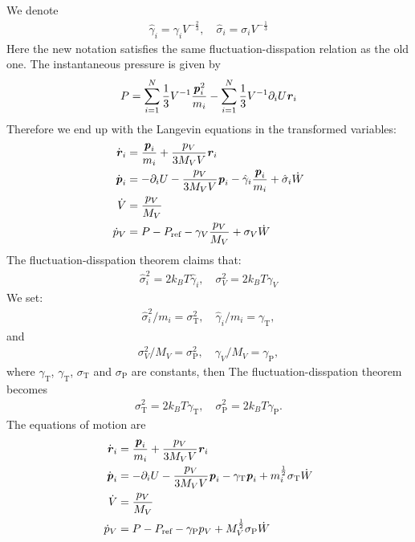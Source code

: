 \documentclass[aps, pre, preprint,unsortedaddress,a4paper,onecolumn]{revtex4}
\newcommand{\vect}[1]{\textbf{\textit{#1}}}
\newcommand{\target}{\textrm{ref}}
\newcommand{\temp}[0]{{\textrm{T}}}
\newcommand{\pres}[0]{{\textrm{P}}}
\begin{document}
We denote
\begin{align}
  \hat \gamma_i = \gamma_i V^{-\frac23}, \quad \hat \sigma_i = \sigma_i V^{-\frac13}
\end{align}
Here the new notation satisfies the same fluctuation-disspation relation as the old one.
The instantaneous pressure is given by
\begin{align}
  P =
  \sum_{i=1}^N \frac13 V^{-1} \frac{\vect p_i^2}{m_i}
  -
  \sum_{i=1}^N \frac13 V^{-1} \partial_i U  \vect r_i
\end{align}
Therefore we end up with the Langevin equations in the transformed variables:
\begin{align}
  \dot{\vect r}_i
  &= \frac{\vect p_i}{m_i} + \frac{p_V}{3M_VV} \vect r_i\\
  \dot{\vect p}_i
  & =
  -\partial_i U - \frac{p_V}{3M_VV}\vect p_i - \hat\gamma_i\frac{\vect p_i}{m_i}
  + \hat\sigma_i\dot W\\
  \dot{V} 
  &=
  \frac{p_V}{M_V} \\
  \dot{p}_V
  &=
  P - P_\target - \gamma_V  \frac{p_V}{M_V} + \sigma_V\dot W   
\end{align}
The fluctuation-disspation theorem claims that:
\begin{align}
  \hat \sigma_i^2 = 2k_BT \hat\gamma_i ,\quad
  \sigma_V^2 = 2k_BT \gamma_V 
\end{align}
We set:
\begin{align}
  \hat\sigma_i^2 / m_i = \sigma_\temp^2, \quad \hat\gamma_i / m_i = \gamma_\temp,
\end{align}
and
\begin{align}
  \sigma_V^2 / M_V = \sigma_\pres^2, \quad \gamma_V / M_V = \gamma_\pres,
\end{align}
where $\gamma_\temp$, $\gamma_\temp$, $\sigma_\temp$ and $\sigma_\pres$ are constants, then
The fluctuation-disspation theorem becomes
\begin{align}
  \sigma_\temp^2 = 2k_BT \gamma_\temp ,\quad
  \sigma_\pres^2 = 2k_BT \gamma_\pres.
\end{align}
The equations of motion are
\begin{align}\label{eq:eom-1}
  \dot{\vect r}_i
  &= \frac{\vect p_i}{m_i} + \frac{p_V}{3M_VV} \vect r_i\\\label{eq:eom-2}
  \dot{\vect p}_i
  & =
  -\partial_i U - \frac{p_V}{3M_VV}\vect p_i - \gamma_\temp{\vect p_i}
  + m_i^{\frac12}\sigma_\temp\dot W\\ \label{eq:eom-3}
  \dot{V} 
  &=
  \frac{p_V}{M_V} \\\label{eq:eom-4}
  \dot{p}_V
  &=
  P - P_\target - \gamma_\pres  {p_V} +M_V^{\frac12} \sigma_\pres\dot W   
\end{align}
\end{document}
